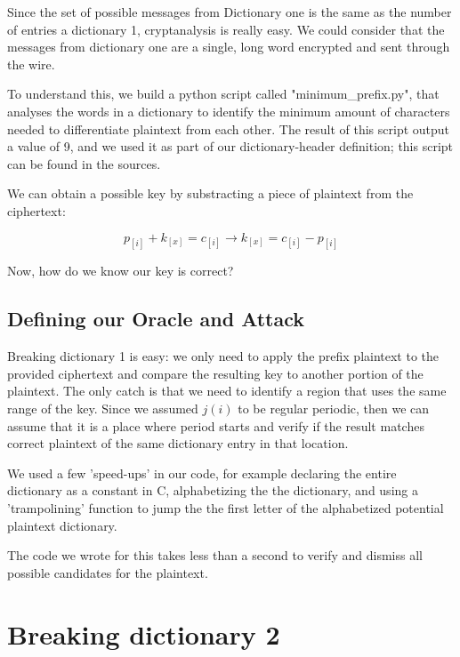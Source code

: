 \documentclass[pdftex,12pt,letter]{article}
\begin{document}
Since the set of possible messages from Dictionary one is the same as the number of 
entries a dictionary 1, cryptanalysis is really easy. We could consider that the 
messages from dictionary one are a single, long word encrypted and sent through the wire.

To understand this, we build a python script called "minimum\_prefix.py", that analyses the 
words in a dictionary to identify the minimum amount of characters needed to differentiate
plaintext from each other. The result of this script output a value of 9, and we used it
as part of our dictionary-header definition; this script can be found in the sources.


We can obtain a possible key by substracting a piece of plaintext from the ciphertext:

\begin{equation}
    p_{[i]} + k_{[x]} = c_{[i]} \rightarrow k_{[x]} = c_{[i]} - p_{[i]}
\end{equation}

Now, how do we know our key is correct?

\subsection{Defining our Oracle and Attack}

Breaking dictionary 1 is easy: we only need to apply the prefix plaintext to
the provided ciphertext and compare the resulting  key to another portion of
the plaintext. The only catch is that we need to identify a region that uses
the same range of the key. Since we assumed $j(i)$ to be regular periodic, then
we can assume that it is a place where period starts and verify if the result
matches correct plaintext of the same dictionary entry in that location. 

We used a few 'speed-ups' in our code, for example declaring the entire
dictionary as a constant in C, alphabetizing the the dictionary, and 
using a 'trampolining' function to jump the the first letter of the
alphabetized potential plaintext dictionary.  

The code we wrote for this takes less than a second to verify and dismiss all
possible candidates for the plaintext. 



\section{Breaking dictionary 2}
\end{document}

